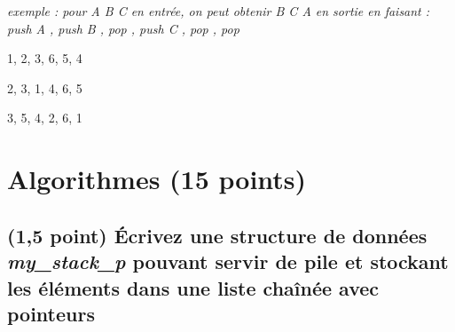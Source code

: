 \documentclass[11pt,a4paper]{article}
\begin{document}
\bigskip

\begin{center}
\noindent \textit{exemple : pour \og A B C \fg{} en entrée, on peut obtenir \og B C A \fg{} en sortie en faisant : \linebreak
\og push A \fg, \og push B \fg, \og pop \fg, \og push C \fg, \og pop \fg, \og pop \fg }
\end{center}

\medskip


\begin{center}

\begin{large}
1, 2, 3, 6, 5, 4
\end{large}

\begin{center}
\end{center}


\begin{large}
2, 3, 1, 4, 6, 5
\end{large}

\begin{center}
\end{center}


\begin{large}
3, 5, 4, 2, 6, 1
\end{large}

\begin{center}
\end{center}

\end{center}

\vfillLast

%
\section{Algorithmes (15 points)}


\subsection{(1,5 point) \'Ecrivez une structure de données \og \textit{my\_stack\_p} \fg{} pouvant servir de pile et stockant les éléments dans une liste chaînée avec pointeurs }
\end{document}
